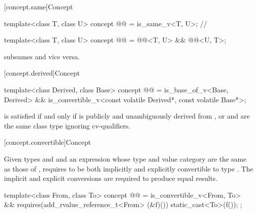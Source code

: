 [concept.same]{Concept }

\begin{itemdecl}
template<class T, class U>
  concept @@ = is_same_v<T, U>;       // \expos

template<class T, class U>
  concept @@ = @@<T, U> && @@<U, T>;
\end{itemdecl}

\begin{itemdescr}
\pnum
\begin{note}
 subsumes  and
vice versa.
\end{note}
\end{itemdescr}

[concept.derived]{Concept }

\begin{itemdecl}
template<class Derived, class Base>
  concept @@ =
    is_base_of_v<Base, Derived> &&
    is_convertible_v<const volatile Derived*, const volatile Base*>;
\end{itemdecl}

\begin{itemdescr}
\pnum
\begin{note}
 is satisfied if and only if
 is publicly and unambiguously derived from , or
 and  are the same class type ignoring cv-qualifiers.
\end{note}
\end{itemdescr}

[concept.convertible]{Concept }

\pnum
Given types  and  and
an expression 
whose type and value category are the same as those of ,
 requires 
to be both implicitly and explicitly convertible to type .
The implicit and explicit conversions are required to produce equal
results.

\begin{itemdecl}
template<class From, class To>
  concept @@ =
    is_convertible_v<From, To> &&
    requires(add_rvalue_reference_t<From> (&f)()) {
      static_cast<To>(f());
    };
\end{itemdecl}

